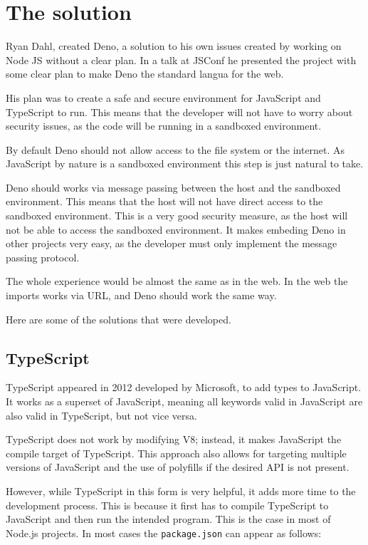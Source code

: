 \documentclass[10pt,journal,compsoc]{IEEEtran}
\begin{document}
\section{The solution}

Ryan Dahl, created Deno, a solution to his own issues created by working on Node JS without a clear plan. In a talk at JSConf \cite{FKNODE} he presented the project with some clear plan to make Deno the standard langua for the web.

His plan was to create a safe and secure environment for JavaScript and TypeScript to run. This means that the developer will not have to worry about security issues, as the code will be running in a sandboxed environment.

By default Deno should not allow access to the file system or the internet. As JavaScript by nature is a sandboxed environment this step is just natural to take.

Deno should works via message passing between the host and the sandboxed environment. This means that the host will not have direct access to the sandboxed environment. This is a very good security measure, as the host will not be able to access the sandboxed environment. It makes embeding Deno in other projects very easy, as the developer must only implement the message passing protocol.

The whole experience would be almost the same as in the web. In the web the imports works via URL, and Deno should work the same way.

Here are some of the solutions that were developed.

\subsection{TypeScript}

TypeScript appeared in 2012 developed by Microsoft, to add types to JavaScript. It works as a superset of JavaScript, meaning all keywords valid in JavaScript are also valid in TypeScript, but not vice versa. \cite{TypeScript} \cite{10162220}

TypeScript does not work by modifying V8; instead, it makes JavaScript the compile target of TypeScript. This approach also allows for targeting multiple versions of JavaScript and the use of polyfills \cite{Polyfill} if the desired API is not present.

However, while TypeScript in this form is very helpful, it adds more time to the development process. This is because it first has to compile TypeScript to JavaScript and then run the intended program. This is the case in most of Node.js projects. In most cases the \verb|package.json| can appear as follows:
\end{document}
